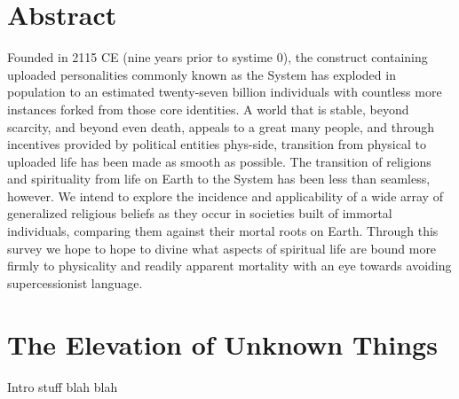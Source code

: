 \hypertarget{abstract}{%
\section*{Abstract}\label{abstract}}

Founded in 2115 CE (nine years prior to systime 0), the construct containing uploaded personalities commonly known as the System has exploded in population to an estimated twenty-seven billion individuals with countless more instances forked from those core identities. A world that is stable, beyond scarcity, and beyond even death, appeals to a great many people, and through incentives provided by political entities phys-side, transition from physical to uploaded life has been made as smooth as possible. The transition of religions and spirituality from life on Earth to the System has been less than seamless, however. We intend to explore the incidence and applicability of a wide array of generalized religious beliefs as they occur in societies built of immortal individuals, comparing them against their mortal roots on Earth. Through this survey we hope to hope to divine what aspects of spiritual life are bound more firmly to physicality and readily apparent mortality with an eye towards avoiding supercessionist language.

\hypertarget{the-elevation-of-unknown-things}{%
\section*{The Elevation of Unknown Things}\label{the-elevation-of-unknown-things}}

Intro stuff blah blah
